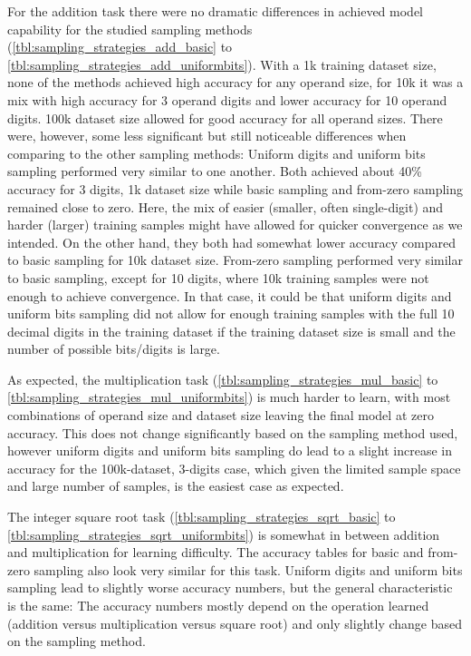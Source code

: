For the addition task there were no dramatic differences in achieved model capability for the studied sampling methods  (\cref{tbl:sampling_strategies_add_basic} to \cref{tbl:sampling_strategies_add_uniformbits}). With a 1k training dataset size, none of the methods achieved high accuracy for any operand size, for 10k it was a mix with high accuracy for 3 operand digits and lower accuracy for 10 operand  digits. 100k dataset size allowed for good accuracy for all operand sizes.
There were, however, some less significant but still noticeable differences when comparing to the other sampling methods: Uniform digits and uniform bits sampling performed very similar to one another. Both achieved about 40\% accuracy for 3 digits, 1k dataset size while basic sampling and from-zero sampling remained close to zero. Here, the mix of easier (smaller, often single-digit) and harder (larger) training samples might have allowed for quicker convergence as we intended. On the other hand, they both had somewhat lower accuracy compared to basic sampling for 10k dataset size. From-zero sampling performed very similar to basic sampling,  except for 10 digits, where 10k training samples were not enough to achieve convergence. In that case, it could be that uniform digits and uniform bits sampling did not allow for enough training samples with the full 10 decimal digits in the training dataset if the training dataset size is small and the number of possible bits/digits is large.


As expected, the multiplication task (\cref{tbl:sampling_strategies_mul_basic} to \cref{tbl:sampling_strategies_mul_uniformbits}) is much harder to learn, with most combinations of operand size and dataset size leaving the final model at zero accuracy. This does not change significantly based on the sampling method used, however uniform digits and uniform bits sampling do lead to a  slight increase in accuracy for the 100k-dataset, 3-digits case, which given the limited sample space and large number of samples, is the easiest case as expected.

The integer square root task (\cref{tbl:sampling_strategies_sqrt_basic} to \cref{tbl:sampling_strategies_sqrt_uniformbits}) is somewhat in between addition and multiplication  for learning difficulty. The accuracy tables for basic and from-zero sampling also look very similar for this task.  Uniform digits and uniform bits sampling lead to slightly worse accuracy numbers, but the general characteristic is the same: The accuracy numbers mostly depend on the operation learned (addition versus multiplication versus square root) and only slightly change based on the sampling method.


